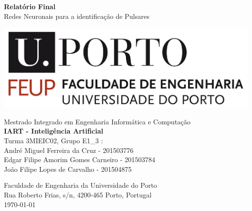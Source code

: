 \begin{titlepage}
  \begin{center}
    \vspace*{1cm}
    
	
      \Huge
      \textbf{Relatório Final}\\
      \vspace{0.5cm}
      \LARGE Redes Neuronais para a identificação de Pulsares

    \vspace{1.5cm}

    \includegraphics[scale=0.15]{img/feup_logo.png}
    
	\vfill
	
	\Large{Mestrado Integrado em Engenharia Informática e Computação}\\
    \vspace{0.5cm}
	\Large\textbf{IART - Inteligência Artificial}\\
    
    \vspace{0.8cm}
    \large
    Turma 3MIEIC02, Grupo E1\_3 :\\
    André Miguel Ferreira da Cruz - 201503776\\
    Edgar Filipe Amorim Gomes Carneiro - 201503784\\
	  João Filipe Lopes de Carvalho - 201504875\\
    \vspace{0.8cm}

    \Large
    Faculdade de Engenharia da Universidade do Porto\\
    Rua Roberto Frias, s/n, 4200-465 Porto, Portugal\\
    
    \vspace{1cm}
    \today

  \end{center}
\end{titlepage}